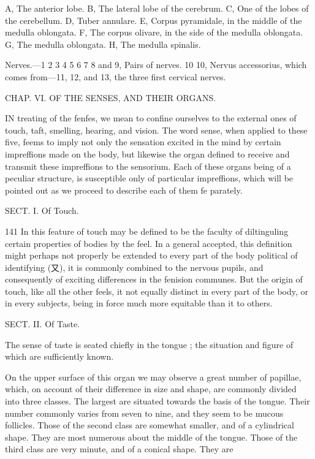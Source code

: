 \documentclass{article}
\begin{document}
A, The anterior lobe. B, The lateral lobe of the cerebrum. C, One of the lobes of the cerebellum. D, Tuber annulare. E, Corpus pyramidale, in the middle of the medulla oblongata. F, The corpus olivare, in the side of the medulla oblongata. G, The medulla oblongata. H, The medulla spinalis.

Nerves.—1 2 3 4 5 6 7 8 and 9, Pairs of nerves.
10 10, Nervus accessorius, which comes from—11, 12,
and 13, the three first cervical nerves.

CHAP. VI. OF THE SENSES, AND THEIR ORGANS.

IN treating of the fenfes, we mean to confine ourselves to the external ones of touch, taft, smelling, hearing, and vision. The word sense, when applied to these five, feems to imply not only the sensation excited in the mind by certain impreffions made on the body, but likewise the organ defined to receive and transmit these impreffions to the sensorium. Each of these organs being of a peculiar structure, is susceptible only of particular impreffions, which will be pointed out as we proceed to describe each of them fe parately.

SECT. I. Of Touch.

141 In this feature of touch may be defined to be the faculty of diltinguling certain properties of bodies by the feel. In a general accepted, this definition might perhaps not properly be extended to every part of the body political of identifying (又), it is commonly combined to the nervous pupils, and consequently of exciting differences in the fenision communes. But the origin of touch, like all the other feels, it not equally distinct in every part of the body, or in every subjects, being in force much more equitable than it to others.

SECT. II. Of Taste.

The sense of taste is seated chiefly in the tongue ; the situation and figure of which are sufficiently known.

On the upper surface of this organ we may observe a great number of papillae, which, on account of their difference in size and shape, are commonly divided into three classes. The largest are situated towards the basis of the tongue. Their number commonly varies from seven to nine, and they seem to be mucous follicles. Those of the second class are somewhat smaller, and of a cylindrical shape. They are most numerous about the middle of the tongue. Those of the third class are very minute, and of a conical shape. They are
\end{document}
